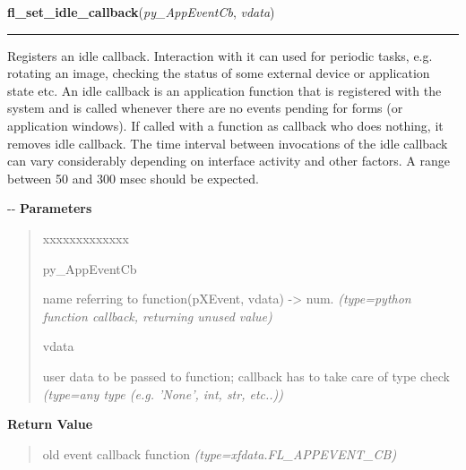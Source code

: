 \hspace{.8\funcindent}\begin{boxedminipage}{\funcwidth}

    \raggedright \textbf{fl\_set\_idle\_callback}(\textit{py\_AppEventCb}, \textit{vdata})

    \vspace{-1.5ex}

    \rule{\textwidth}{0.5\fboxrule}
\setlength{\parskip}{2ex}

Registers an idle callback. Interaction with it  can used for periodic
tasks, e.g. rotating an image, checking the status of some external
device or application state etc. An idle callback is an application
function that is registered with the system and is called whenever there
are no events pending for forms (or application windows). If called with
a function as callback who does nothing, it removes idle callback.
The time interval between invocations of the idle callback can vary
considerably depending on interface activity and other factors. A
range between 50 and 300 msec should be expected.

-{}-
\setlength{\parskip}{1ex}
      \textbf{Parameters}
      \vspace{-1ex}

      \begin{quote}
        \begin{Ventry}{xxxxxxxxxxxxx}

          \item[py\_AppEventCb]


name referring to function(pXEvent, vdata) -> num.
            {\it (type=python function callback, returning unused value)}

          \item[vdata]


user data to be passed to function; callback has to take care of
type check
            {\it (type=any type (e.g. 'None', int, str, etc..))}

        \end{Ventry}

      \end{quote}

      \textbf{Return Value}
    \vspace{-1ex}

      \begin{quote}

old event callback function
      {\it (type=xfdata.FL\_APPEVENT\_CB)}


\end{quote}
\end{boxedminipage}
